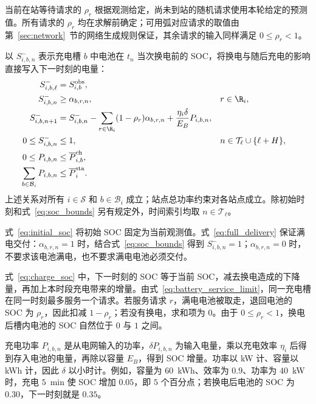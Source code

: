 当前在站等待请求的 $\rho_r$ 根据观测给定，尚未到站的随机请求使用本轮给定的预测值。所有请求的 $\rho_r$ 均在求解前确定；可用弧对应请求的取值由第~\ref{sec:network}~节的网络生成规则保证，其余请求的输入同样满足 $0\le\rho_r<1$。

以 $S_{i,b,n}^{-}$ 表示充电槽 $b$ 中电池在 $t_n$ 当次换电前的 SOC，将换电与随后充电的影响直接写入下一时刻的电量：
\begin{subequations}\label{eq:battery_dynamics}
\begin{align}
S_{i,b,\ell}^{-}&=S_{i,b}^{\mathrm{obs}},\label{eq:initial_soc}\\
S_{i,b,n}^{-}&\ge\alpha_{b,r,n},
&&r\in\R_i,\label{eq:full_delivery}\\
S_{i,b,n+1}^{-}&=S_{i,b,n}^{-}
-\sum_{r\in\R_i}(1-\rho_r)\alpha_{b,r,n}
+\frac{\eta_i\delta}{E_B}P_{i,b,n},\label{eq:charge_soc}\\
0\le S_{i,b,n}^{-}&\le1,
&&n\in\mathcal T_\ell\cup\{\ell+H\},\label{eq:soc_bounds}\\
0\le P_{i,b,n}&\le\overline P_{i,b}^{\mathrm{ch}},\label{eq:device_power}\\
\sum_{b\in\mathcal B_i}P_{i,b,n}&\le\overline P_i^{\mathrm{sta}}.\label{eq:station_power}
\end{align}
\end{subequations}
上述关系对所有 $i\in\mathcal S$ 和 $b\in\mathcal B_i$ 成立；站点总功率约束对各站点成立。除初始时刻和式~\eqref{eq:soc_bounds} 另有规定外，时间索引均取 $n\in\mathcal T_\ell$。

式~\eqref{eq:initial_soc} 将初始 SOC 固定为当前观测值。式~\eqref{eq:full_delivery} 保证满电交付：$\alpha_{b,r,n}=1$ 时，结合式~\eqref{eq:soc_bounds} 得到 $S_{i,b,n}^{-}=1$；$\alpha_{b,r,n}=0$ 时，不要求该电池满电，也不要求满电电池必须交付。

式~\eqref{eq:charge_soc} 中，下一时刻的 SOC 等于当前 SOC，减去换电造成的下降量，再加上本时段充电带来的增量。由式~\eqref{eq:battery_service_limit}，同一充电槽在同一时刻最多服务一个请求。若服务请求 $r$，满电电池被取走，退回电池的 SOC 为 $\rho_r$，因此扣减 $1-\rho_r$；若没有换电，求和项为 $0$。由于 $0\le\rho_r<1$，换电后槽内电池的 SOC 自然位于 $0$ 与 $1$ 之间。

充电功率 $P_{i,b,n}$ 是从电网输入的功率，$\delta P_{i,b,n}$ 为输入电量，乘以充电效率 $\eta_i$ 后得到存入电池的电量，再除以容量 $E_B$，得到 SOC 增量。功率以 kW 计、容量以 kWh 计，因此 $\delta$ 以小时计。例如，容量为 $60$~kWh、效率为 $0.9$、功率为 $40$~kW 时，充电 $5$~min 使 SOC 增加 $0.05$，即 $5$ 个百分点；若换电后电池的 SOC 为 $0.30$，下一时刻就是 $0.35$。

